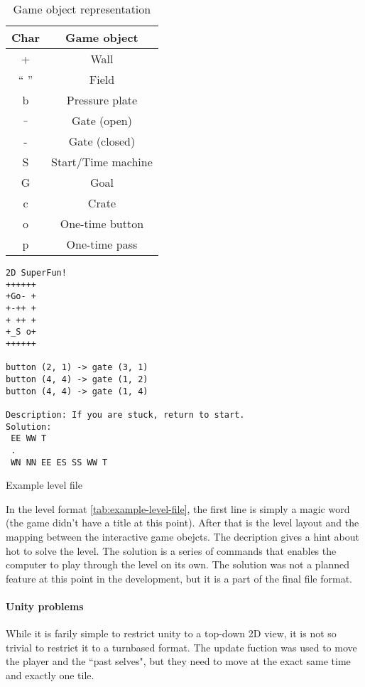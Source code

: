 \begin{table}
\begin{tabular}{|c|c|}
\hline
Char & Game object\\
\hline
+ & Wall\\
`` '' & Field\\
b & Pressure plate\\
$\_$ & Gate (open)\\
- & Gate (closed)\\
S & Start/Time machine\\
G & Goal\\
c & Crate\\
o & One-time button\\
p & One-time pass\\
\hline
\end{tabular}
\label{game-object-representation}
\caption{Game object representation}
\end{table}

\begin{table}
\begin{verbatim}
2D SuperFun!
++++++
+Go- +
+-++ +
+ ++ +
+_S o+
++++++

button (2, 1) -> gate (3, 1)
button (4, 4) -> gate (1, 2)
button (4, 4) -> gate (1, 4)

Description: If you are stuck, return to start.
Solution:
 EE WW T
 .
 WN NN EE ES SS WW T
\end{verbatim}
\label{example-level-file}
\caption{Example level file}
\end{table}

In the level format \ref{tab:example-level-file}, the first line is simply a magic word (the game didn't have
a title at this point). After that is the level layout and the mapping between
the interactive game obejcts. The decription gives a hint about hot to solve
the level. The solution is a series of commands that enables the computer to
play through the level on its own. The solution was not a planned feature at
this point in the development, but it is a part of the final file format.

\paragraph{Unity problems}
While it is farily simple to restrict unity to a top-down 2D view, it
is not so trivial to restrict it to a turnbased format. The update
fuction was used to move the player and the ``past selves", but they need
to move at the exact same time and exactly one tile.

